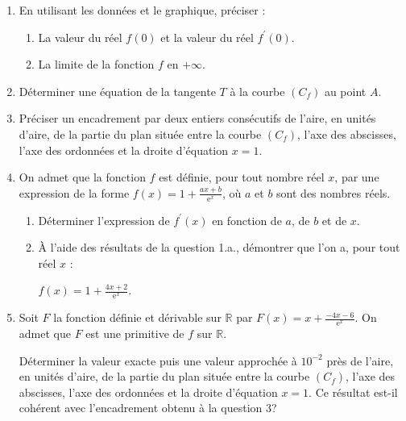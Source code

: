 \begin{center}
\end{center}
\begin{enumerate}
     \item
     En utilisant les données et le graphique, préciser :
     \begin{enumerate}[label=\alph*.] 
          \item
          La valeur du réel $f\left(0\right)$ et la valeur du réel $f^{\prime}\left(0\right)$.
          \item
          La limite de la fonction $f$ en $+\infty $.
     \end{enumerate}
     \item
     Déterminer une équation de la tangente $T$ à la courbe $\left(C_{f}\right)$ au point $A$.
     \item
     Préciser un encadrement par deux entiers consécutifs de l'aire, en unités d'aire, de la partie du plan située entre la courbe $\left(C_{f}\right)$, l'axe des abscisses, l'axe des ordonnées et la droite d'équation $x=1$.
     \item
     On admet que la fonction $f$ est définie, pour tout nombre réel $x$, par une expression de la forme $f\left(x\right)=1+\frac{ax+b}{\text{e}^{x}}$, où $a$ et $b$ sont des nombres réels.
     \begin{enumerate}[label=\alph*.]
          \item
          Déterminer l'expression de $f^{\prime}\left(x\right)$ en fonction de $a$, de $b$ et de $x$.
          \item
          À l'aide des résultats de la question 1.a., démontrer que l'on a, pour tout réel $x$ :
          \par
          $f\left(x\right)=1+\frac{4x+2}{\text{e}^{x}}$.
     \end{enumerate}
     \item
     Soit $F$ la fonction définie et dérivable sur $\mathbb{R}$ par $F\left(x\right)=x+\frac{- 4x -6}{\text{e}^{x}}$. On admet que $F$ est une primitive de $f$ sur $\mathbb{R}$.
     \par
     Déterminer la valeur exacte puis une valeur approchée à $10^{-2}$ près de l'aire, en unités d'aire, de la partie du plan située entre la courbe $\left(C_{f}\right)$, l'axe des abscisses, l'axe des ordonnées et la droite d'équation $x=1$. Ce résultat est-il cohérent avec l'encadrement obtenu à la question 3?
\end{enumerate}
